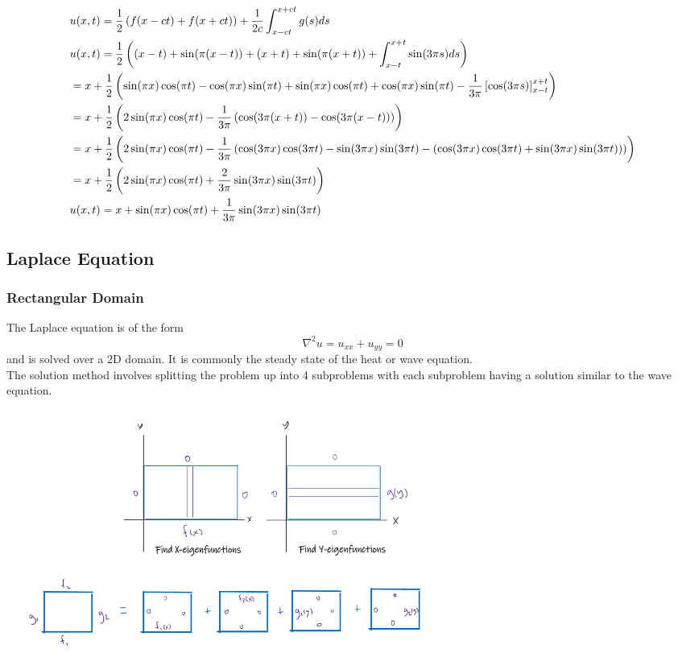 \documentclass[11pt, fleqn]{article}
\begin{document}
\begin{small}
\begin{align*}
    &u(x,t)=\frac{1}{2}\left( f(x-ct)+f(x+ct) \right)+\frac{1}{2c}\int_{x-ct}^{x+ct}g(s)ds\\
    &u(x,t)=\frac{1}{2}\left( (x-t)+\sin(\pi(x-t))+(x+t)+\sin(\pi(x+t))+\int_{x-t}^{x+t}\sin(3\pi s)ds \right)\\
    &=x+\frac{1}{2}\left( \sin(\pi x)\cos(\pi t)-\cos(\pi x)\sin(\pi t)+\sin(\pi x)\cos(\pi t)+\cos(\pi x)\sin(\pi t)-\frac{1}{3\pi}\left[ \cos(3\pi s) \right]_{x-t}^{x+t} \right)\\
    &=x+\frac{1}{2}\left( 2\sin(\pi x)\cos(\pi t)-\frac{1}{3\pi}\left( \cos(3\pi(x+t))-\cos(3\pi(x-t)) \right) \right)\\
    &=x+\frac{1}{2}\left( 2\sin(\pi x)\cos(\pi t)-\frac{1}{3\pi}\left( \cos(3\pi x)\cos(3\pi t)-\sin(3\pi x)\sin(3\pi t)-(\cos(3\pi x)\cos(3\pi t)+\sin(3\pi x)\sin(3\pi t)) \right) \right)\\
    &=x+\frac{1}{2}\left( 2\sin(\pi x)\cos(\pi t)+\frac{2}{3\pi}\sin(3\pi x)\sin(3\pi t) \right)\\
    &u(x,t)=x+\sin(\pi x)\cos(\pi t)+\frac{1}{3\pi}\sin(3\pi x)\sin(3\pi t)
\end{align*}
\end{small}

\subsection{Laplace Equation}
\subsubsection{Rectangular Domain}
The Laplace equation is of the form $$\nabla^2u=u_{xx}+u_{yy}=0$$
and is solved over a 2D domain. It is commonly the steady state of the heat or wave equation.\\
The solution method involves splitting the problem up into 4 subproblems with each subproblem having a solution similar to the wave equation.\\
\begin{center}
    \includegraphics[width=14cm]{PDEPictures/laplace.png}
\end{center}
\end{document}

